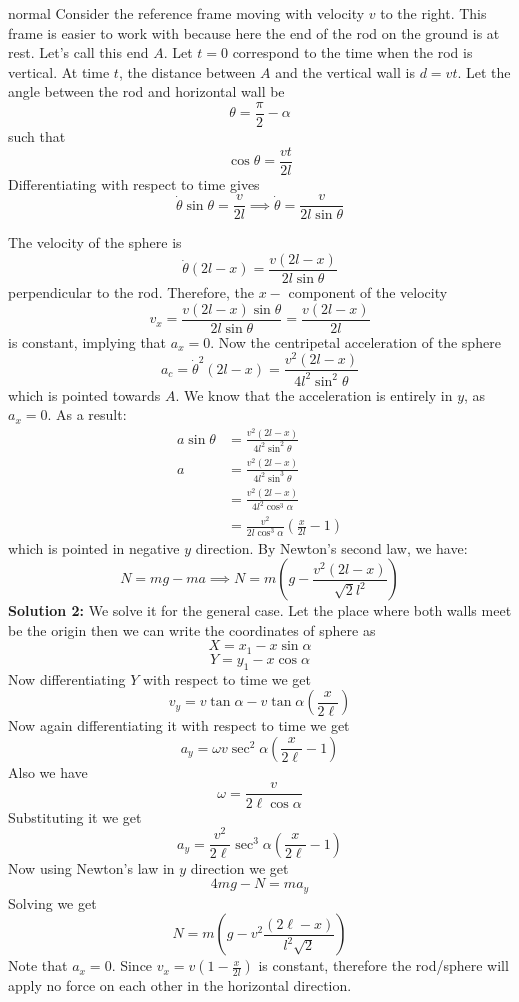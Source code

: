 \begin{solution}{normal}
Consider the reference frame moving with velocity $v$ to the right. This frame is easier to work with because here the end of the rod on the ground is at rest. Let's call this end $A$. Let $t=0$ correspond to the time when the rod is vertical. At time $t$, the distance between $A$ and the vertical wall is $d=vt$. Let the angle between the rod and horizontal wall be
$$\theta = \frac{\pi}{2}-\alpha$$
such that
$$\cos \theta = \frac{vt}{2l}$$
Differentiating with respect to time gives
$$\dot \theta \sin \theta= \frac{v}{2l} \implies \dot \theta = \frac{v}{2l \sin \theta}$$

The velocity of the sphere is
$$\dot \theta (2l-x) = \frac{v(2l-x)}{2l \sin \theta}$$
perpendicular to the rod. Therefore, the $x-$ component of the velocity
$$v_x = \frac{v(2l-x)\sin \theta}{2l \sin \theta} = \frac{v(2l-x)}{2l }$$
is constant, implying that $a_x = 0$. Now the centripetal acceleration of the sphere
$$a_c= \dot \theta^2 (2l-x) = \frac{v^2(2l-x)}{4l^2 \sin^2 \theta}$$
which is pointed towards $A$. We know that the acceleration is entirely in $y$, as $a_x = 0$. As a result:
\begin{align*}
a \sin \theta &= \frac{v^2(2l-x)}{4l^2 \sin^2 \theta} \\
a &= \frac{v^2(2l-x)}{4l^2 \sin^3 \theta} \\
  &=\frac{v^2(2l-x)}{4l^2 \cos^3 \alpha}  \\
 &= \frac{v^2}{2l \cos^3 \alpha}(\frac{x}{2l}-1)
\end{align*}
which is pointed in negative $y$ direction. By Newton's second law, we have:
$$N = mg - ma \implies \boxed{N=m(g-\frac{v^2(2l-x)}{\sqrt2 l^2})}$$
\tcbline
\textbf{Solution 2:} We solve it for the general case. Let the place where both walls meet be the origin then we can write the coordinates of sphere as
$$X= x_1-x\sin\alpha$$
$$Y= y_1-x\cos\alpha$$
Now differentiating $Y$ with respect to time we get
$$ v_y=v\tan\alpha-v\tan\alpha\left(\frac{x}{2\ell}\right)$$
Now again differentiating it with respect to time we get
$$a_y=\omega v\sec^2\alpha\left(\frac{x}{2\ell}-1\right)$$
Also we have
$$\omega=\frac{v}{2\ell\cos\alpha}$$
Substituting it we get $$a_y=\frac{v^2}{2\ell}{\sec^3\alpha}\left(\frac{x}{2\ell}-1\right)$$
Now using Newton’s law in $y$ direction we get
$$4mg-N=ma_y$$
Solving we get
$$N=m\left(g-v^2\frac{(2\ell-x)}{l^2\sqrt2}\right)$$
Note that $a_x=0$. Since $\displaystyle v_x=v\left(1-\frac{x}{2l}\right)$ is constant, therefore the rod/sphere will apply no force on each other in the horizontal direction.
\end{solution}
